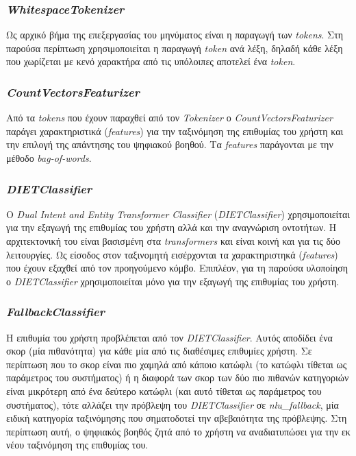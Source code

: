 \subsubsection{\emph{WhitespaceTokenizer}}
Ως αρχικό βήμα της επεξεργασίας του μηνύματος είναι η παραγωγή των \emph{tokens}. Στη παρούσα περίπτωση χρησιμοποιείται η παραγωγή \emph{token} ανά λέξη, δηλαδή κάθε λέξη που χωρίζεται με κενό χαρακτήρα από τις υπόλοιπες αποτελεί ένα \emph{token}.

\subsubsection{\emph{CountVectorsFeaturizer}}
Από τα \emph{tokens} που έχουν παραχθεί από τον \emph{Tokenizer} ο \emph{CountVectorsFeaturizer} παράγει χαρακτηριστικά (\emph{features}) για την ταξινόμηση της επιθυμίας του χρήστη και την επιλογή της απάντησης του ψηφιακού βοηθού. Τα \emph{features} παράγονται με την μέθοδο \emph{bag-of-words}.

\subsubsection{\emph{DIETClassifier}}
Ο \emph{Dual Intent and Entity Transformer Classifier} (\emph{DIETClassifier}) χρησιμοποιείται για την εξαγωγή της επιθυμίας του χρήστη αλλά και την αναγνώριση οντοτήτων. Η αρχιτεκτονική του είναι βασισμένη στα \emph{transformers} και είναι κοινή και για τις δύο λειτουργίες. Ως είσοδος στον ταξινομητή εισέρχονται τα χαρακτηριστηκά (\emph{features}) που έχουν εξαχθεί από τον προηγούμενο κόμβο. Επιπλέον, για τη παρούσα υλοποίηση ο \emph{DIETClassifier} χρησιμοποιείται μόνο για την εξαγωγή της επιθυμίας του χρήστη.

\subsubsection{\emph{FallbackClassifier}}
Η επιθυμία του χρήστη προβλέπεται από τον \emph{DIETClassifier}. Αυτός αποδίδει ένα σκορ (μία πιθανότητα) για κάθε μία από τις διαθέσιμες επιθυμίες χρήστη. Σε περίπτωση που το σκορ είναι πιο χαμηλά από κάποιο κατώφλι (το κατώφλι τίθεται ως παράμετρος του συστήματος) ή η διαφορά των σκορ των δύο πιο πιθανών κατηγοριών είναι μικρότερη από ένα δεύτερο κατώφλι (και αυτό τίθεται ως παράμετρος του συστήματος), τότε αλλάζει την πρόβλεψη του \emph{DIETClassifier} σε \emph{nlu\_fallback}, μία ειδική κατηγορία ταξινόμησης που σηματοδοτεί την αβεβαιότητα της πρόβλεψης. Στη περίπτωση αυτή, ο ψηφιακός βοηθός ζητά από το χρήστη να αναδιατυπώσει για την εκ νέου ταξινόμηση της επιθυμίας του.

